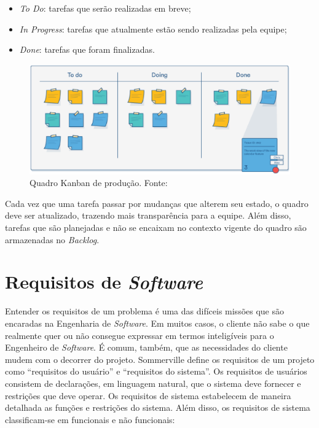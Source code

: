     \begin{itemize}
        \item \textit{To Do}: tarefas que serão realizadas em breve;
        \item \textit{In Progress}: tarefas que atualmente estão sendo realizadas pela equipe;
        \item \textit{Done}: tarefas que foram finalizadas.
    \end{itemize}

    \begin{figure}[!htpb]
        \centering
        \includegraphics[keepaspectratio=true,scale=0.5]{figuras/kanban.eps}
        \caption{Quadro Kanban de produção. Fonte: \cite{radigan_2015}}
        \label{kanban}
    \end{figure}

    Cada vez que uma tarefa passar por mudanças que alterem seu estado, o quadro deve ser atualizado, trazendo mais transparência para a equipe. Além disso, tarefas que são planejadas e não se encaixam no contexto vigente do quadro são armazenadas no \textit{Backlog}.

\section{Requisitos de \textit{Software}}
Entender os requisitos de um problema é uma das difíceis missões
que são encaradas na Engenharia de \textit{Software}. Em muitos casos, o cliente não sabe o que realmente quer ou não consegue expressar em termos inteligíveis para o Engenheiro de \textit{Software}. É comum, também, que as necessidades do cliente mudem com o decorrer do projeto. Sommerville \cite{sommerville_2006} define os requisitos de um projeto como ``requisitos do usuário'' e ``requisitos do sistema''. Os requisitos de usuários consistem de declarações, em
linguagem natural, que o sistema deve fornecer e restrições que deve
operar. Os requisitos de sistema estabelecem de maneira detalhada as
funções e restrições do sistema. Além disso, os requisitos de sistema
classificam-se em funcionais e não funcionais:

